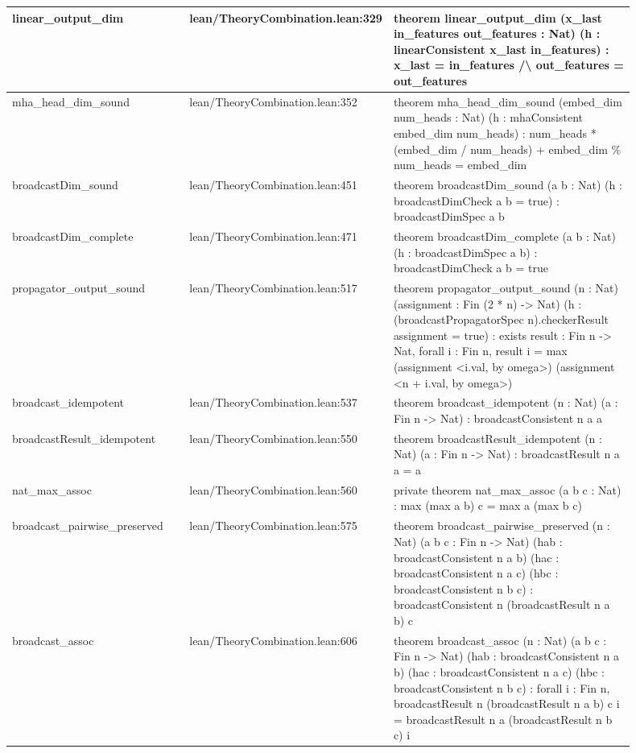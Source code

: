 \documentclass[10pt]{article}
\begin{document}
\begin{longtable}{|p{0.30\linewidth}|p{0.13\linewidth}|p{0.47\linewidth}|}
\hline
linear\_output\_dim & lean/TheoryCombination.lean:329 & theorem linear\_output\_dim (x\_last in\_features out\_features : Nat) (h : linearConsistent x\_last in\_features) : x\_last = in\_features /\textbackslash{} out\_features = out\_features \\
\hline
mha\_head\_dim\_sound & lean/TheoryCombination.lean:352 & theorem mha\_head\_dim\_sound (embed\_dim num\_heads : Nat) (h : mhaConsistent embed\_dim num\_heads) : num\_heads * (embed\_dim / num\_heads) + embed\_dim \% num\_heads = embed\_dim \\
\hline
broadcastDim\_sound & lean/TheoryCombination.lean:451 & theorem broadcastDim\_sound (a b : Nat) (h : broadcastDimCheck a b = true) : broadcastDimSpec a b \\
\hline
broadcastDim\_complete & lean/TheoryCombination.lean:471 & theorem broadcastDim\_complete (a b : Nat) (h : broadcastDimSpec a b) : broadcastDimCheck a b = true \\
\hline
propagator\_output\_sound & lean/TheoryCombination.lean:517 & theorem propagator\_output\_sound (n : Nat) (assignment : Fin (2 * n) -> Nat) (h : (broadcastPropagatorSpec n).checkerResult assignment = true) : exists result : Fin n -> Nat, forall i : Fin n, result i = max (assignment <i.val, by omega>) (assignment <n + i.val, by omega>) \\
\hline
broadcast\_idempotent & lean/TheoryCombination.lean:537 & theorem broadcast\_idempotent (n : Nat) (a : Fin n -> Nat) : broadcastConsistent n a a \\
\hline
broadcastResult\_idempotent & lean/TheoryCombination.lean:550 & theorem broadcastResult\_idempotent (n : Nat) (a : Fin n -> Nat) : broadcastResult n a a = a \\
\hline
nat\_max\_assoc & lean/TheoryCombination.lean:560 & private theorem nat\_max\_assoc (a b c : Nat) : max (max a b) c = max a (max b c) \\
\hline
broadcast\_pairwise\_preserved & lean/TheoryCombination.lean:575 & theorem broadcast\_pairwise\_preserved (n : Nat) (a b c : Fin n -> Nat) (hab : broadcastConsistent n a b) (hac : broadcastConsistent n a c) (hbc : broadcastConsistent n b c) : broadcastConsistent n (broadcastResult n a b) c \\
\hline
broadcast\_assoc & lean/TheoryCombination.lean:606 & theorem broadcast\_assoc (n : Nat) (a b c : Fin n -> Nat) (hab : broadcastConsistent n a b) (hac : broadcastConsistent n a c) (hbc : broadcastConsistent n b c) : forall i : Fin n, broadcastResult n (broadcastResult n a b) c i = broadcastResult n a (broadcastResult n b c) i \\

\end{longtable}
\end{document}
